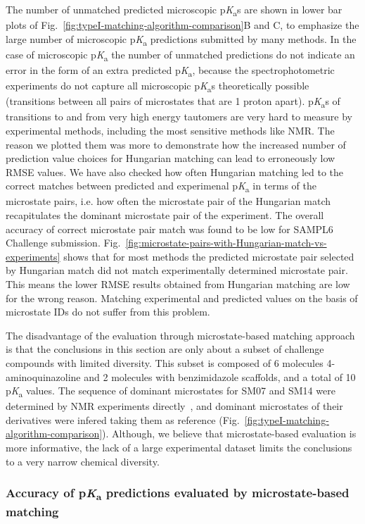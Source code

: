 \documentclass[9pt,lineno,final]{elife}
\newcommand{\pKa}{p\textit{K}\textsubscript{a}}
\begin{document}
The number of unmatched predicted microscopic \pKa{s} are shown in lower bar plots of Fig.~\ref{fig:typeI-matching-algorithm-comparison}B and C, to emphasize the large number of microscopic \pKa{} predictions submitted by many methods. 
In the case of microscopic \pKa{} the number of unmatched predictions do not indicate an error in the form of an extra predicted \pKa{}, because the spectrophotometric experiments do not capture all microscopic \pKa{}s theoretically possible (transitions between all pairs of microstates that are 1 proton apart). 
\pKa{}s of transitions to and from very high energy tautomers are very hard to measure by experimental methods, including the most sensitive methods like NMR. 
The reason we plotted them was more to demonstrate how the increased number of prediction value choices for Hungarian matching can lead to erroneously low RMSE values. 
We have also checked how often Hungarian matching led to the correct matches between predicted and experimenal \pKa{} in terms of the microstate pairs, i.e. how often the microstate pair of the Hungarian match recapitulates the dominant microstate pair of the experiment. The overall accuracy of correct microstate pair match was found to be low for SAMPL6 Challenge submission. 
Fig.~\ref{fig:microstate-pairs-with-Hungarian-match-vs-experiments} shows that for most methods the predicted microstate pair selected by Hungarian match did not match experimentally determined microstate pair.
This means the lower RMSE results obtained from Hungarian matching are low for the wrong reason. 
Matching experimental and predicted values on the basis of microstate IDs do not suffer from this problem.  

The disadvantage of the evaluation through microstate-based matching approach is that the conclusions in this section are only about a subset of challenge compounds with limited diversity. This subset is composed of 6 molecules 4-aminoquinazoline and 2 molecules with benzimidazole scaffolds, and a total of 10 \pKa{} values. The sequence of dominant microstates for SM07 and SM14 were determined by NMR experiments directly~\citep{Isik:2018:J.Comput.AidedMol.Des.}, and dominant microstates of their derivatives were infered taking them as reference (Fig.~\ref{fig:typeI-matching-algorithm-comparison}). Although, we believe that microstate-based evaluation is more informative, the lack of a large experimental dataset limits the conclusions to a very narrow chemical diversity. 


\subsubsection{Accuracy of \pKa{} predictions evaluated by microstate-based matching}
\end{document}
